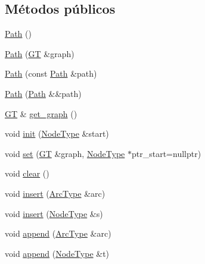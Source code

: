 \subsection*{Métodos públicos}
\begin{DoxyCompactItemize}
\item 
\hyperlink{class_designar_1_1_path_a47a3b5f01fba6977f57ad84fb6f1fda9}{Path} ()
\item 
\hyperlink{class_designar_1_1_path_a92b56646f20bdce1ed05601b983235d6}{Path} (\hyperlink{demo-buildgraph_8_c_a3001c40d2c31ca87ed96cd7d1334a55e}{GT} \&graph)
\item 
\hyperlink{class_designar_1_1_path_a9dc80e39b78c86740d5731899f5cb204}{Path} (const \hyperlink{class_designar_1_1_path}{Path} \&path)
\item 
\hyperlink{class_designar_1_1_path_a873d668006017c410e6808ffb162ceb8}{Path} (\hyperlink{class_designar_1_1_path}{Path} \&\&path)
\item 
\hyperlink{demo-buildgraph_8_c_a3001c40d2c31ca87ed96cd7d1334a55e}{GT} \& \hyperlink{class_designar_1_1_path_a0d4ef1ffdb4bcf2b34267e33c2177773}{get\+\_\+graph} ()
\item 
void \hyperlink{class_designar_1_1_path_aed6cd565cad808bd6d08f0485e89077d}{init} (\hyperlink{class_designar_1_1_path_a7b499fd50e96e3360968d4cfef7a3736}{Node\+Type} \&start)
\item 
void \hyperlink{class_designar_1_1_path_a72190e285c2c85aae75b0c8435f1eee9}{set} (\hyperlink{demo-buildgraph_8_c_a3001c40d2c31ca87ed96cd7d1334a55e}{GT} \&graph, \hyperlink{class_designar_1_1_path_a7b499fd50e96e3360968d4cfef7a3736}{Node\+Type} $\ast$ptr\+\_\+start=nullptr)
\item 
void \hyperlink{class_designar_1_1_path_acc2f49cce82c42701cb703c6d87f6dc2}{clear} ()
\item 
void \hyperlink{class_designar_1_1_path_a0deab29b3241b5df6217bdc705dab131}{insert} (\hyperlink{class_designar_1_1_path_a6e13966351659cedcf3233098b2b7384}{Arc\+Type} \&arc)
\item 
void \hyperlink{class_designar_1_1_path_a9f3a77788f312c464d46d4f76f9b9d6a}{insert} (\hyperlink{class_designar_1_1_path_a7b499fd50e96e3360968d4cfef7a3736}{Node\+Type} \&s)
\item 
void \hyperlink{class_designar_1_1_path_a985717f0848469b05dfc8172eb483ad4}{append} (\hyperlink{class_designar_1_1_path_a6e13966351659cedcf3233098b2b7384}{Arc\+Type} \&arc)
\item 
void \hyperlink{class_designar_1_1_path_a0e69c5a5e1fffd17059b236e13f6587a}{append} (\hyperlink{class_designar_1_1_path_a7b499fd50e96e3360968d4cfef7a3736}{Node\+Type} \&t)

\end{DoxyCompactItemize}
